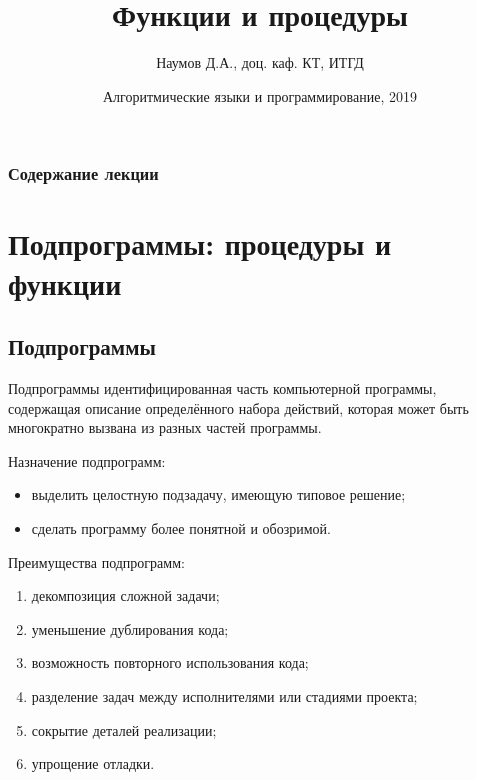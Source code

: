 \documentclass{beamer}
\title[Подпрограммы]{Функции и процедуры}
\author{Наумов Д.А., доц. каф. КТ, ИТГД }
\date[01.04.2019] {Алгоритмические языки и программирование, 2019}
\begin{document}
\begin{frame}
  \titlepage
\end{frame}
  
\begin{frame}
  \frametitle{Содержание лекции}
  \tableofcontents  
\end{frame}
  
\section{Подпрограммы: процедуры и функции}
\subsection{Подпрограммы}
\begin{frame}
\begin{block}{Подпрограммы}
идентифицированная часть компьютерной программы, содержащая описание определённого набора действий, которая может быть многократно вызвана из разных частей программы.
\end{block}
Назначение подпрограмм:
\begin{itemize}
\item выделить целостную подзадачу, имеющую типовое решение;
\item сделать программу более понятной и обозримой.
\end{itemize}
Преимущества подпрограмм:
\begin{enumerate}
\item декомпозиция сложной задачи;
\item уменьшение дублирования кода;
\item возможность повторного использования кода;
\item разделение задач между исполнителями или стадиями проекта;
\item сокрытие деталей реализации;
\item упрощение отладки.
\end{enumerate}
\end{frame} 
\end{document}

